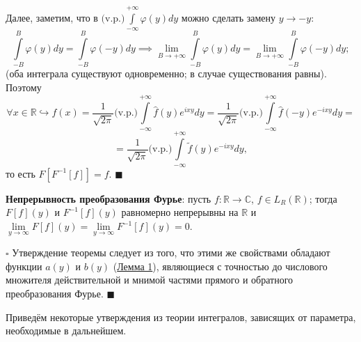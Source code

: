 \documentclass[12pt, a4paper, reqno]{article}
\begin{document}
    Далее, заметим, что в $\text{(v.p.)}\int\limits_{-\infty}^{+\infty}\varphi(y)dy$ можно сделать
    замену $y \to -y$:
    \begin{equation*}
        \int\limits_{-B}^{B} \varphi(y)dy = \int\limits_{-B}^{B} \varphi(-y)dy \implies
        \lim\limits_{B \to +\infty}\int\limits_{-B}^{B} \varphi(y)dy =
        \lim\limits_{B \to +\infty}\int\limits_{-B}^{B} \varphi(-y)dy;
    \end{equation*}
    (оба интеграла существуют одновременно; в случае существования равны). Поэтому
    \begin{equation*}
        \forall x \in \mathbb{R} \hookrightarrow
        f(x) = \frac{1}{\sqrt{2\pi}}\text{(v.p.)}\int\limits_{-\infty}^{+\infty} \hat{f}(y)e^{ixy}dy =
        \frac{1}{\sqrt{2\pi}}\text{(v.p.)}\int\limits_{-\infty}^{+\infty} \hat{f}(-y)e^{-ixy}dy =
    \end{equation*}
    \begin{equation*}
        = \frac{1}{\sqrt{2\pi}}\text{(v.p.)}\int\limits_{-\infty}^{+\infty} \tilde{f}(y)e^{-ixy}dy,
    \end{equation*}
    то есть $F[F^{-1}[f]] = f$.
    $\blacksquare$

    \textbf{Непрерывность преобразования Фурье}: пусть $f: \mathbb{R} \to \mathbb{C}$,
    $f \in L_R(\mathbb{R})$; тогда $F[f](y)$ и $F^{-1}[f](y)$ равномерно непрерывны на $\mathbb{R}$
    и $\lim\limits_{y \to \infty} F[f](y) = \lim\limits_{y \to \infty} F^{-1}[f](y) = 0$.

    $\square$
    Утверждение теоремы следует из того, что этими же свойствами обладают функции $a(y)$ и $b(y)$
    (\hyperlink{FT-continuity}{Лемма 1}), являющиеся с точностью до числового множителя
    действительной и мнимой частями прямого и обратного преобразования Фурье.
    $\blacksquare$

    Приведём некоторые утверждения из теории интегралов, зависящих от параметра, необходимые в дальнейшем.
\end{document}
